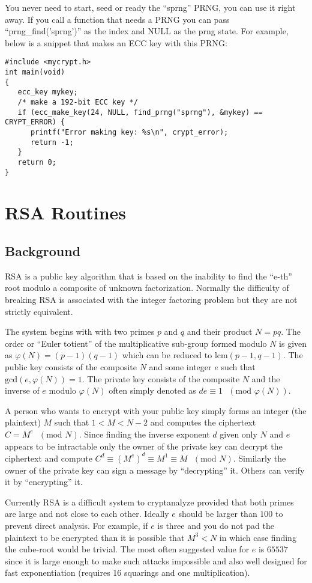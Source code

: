 \documentclass{book}
\def\phi{\varphi}
\begin{document}
You never need to start, seed or ready the ``sprng'' PRNG, you can use it right away.  If you call a function that needs a 
PRNG  you can pass ``prng\_find('sprng')'' as the index and NULL as the prng state.  For example, below is a snippet that
makes an ECC key with this PRNG:
\begin{verbatim}
#include <mycrypt.h>
int main(void)
{
   ecc_key mykey;
   /* make a 192-bit ECC key */
   if (ecc_make_key(24, NULL, find_prng("sprng"), &mykey) == CRYPT_ERROR) {
      printf("Error making key: %s\n", crypt_error);
      return -1;
   }
   return 0;
}
\end{verbatim}

\chapter{RSA Routines}

\section{Background}

RSA is a public key algorithm that is based on the inability to find the ``e-th'' root modulo a composite of unknown 
factorization.  Normally the difficulty of breaking RSA is associated with the integer factoring problem but they are
not strictly equivalent.

The system begins with with two primes $p$ and $q$ and their product $N = pq$.  The order or ``Euler totient'' of the
multiplicative sub-group formed modulo $N$ is given as $\phi(N) = (p - 1)(q - 1)$ which can be reduced to 
$\mbox{lcm}(p - 1, q - 1)$.  The public key consists of the composite $N$ and some integer $e$ such that 
$\mbox{gcd}(e, \phi(N)) = 1$.  The private key consists of the composite $N$ and the inverse of $e$ modulo $\phi(N)$ 
often simply denoted as $de \equiv 1\mbox{ }(\mbox{mod }\phi(N))$.

A person who wants to encrypt with your public key simply forms an integer (the plaintext) $M$ such that 
$1 < M < N-2$ and computes the ciphertext $C = M^e\mbox{ }(\mbox{mod }N)$.  Since finding the inverse exponent $d$
given only $N$ and $e$ appears to be intractable only the owner of the private key can decrypt the ciphertext and compute
$C^d \equiv \left (M^e \right)^d \equiv M^1 \equiv M\mbox{ }(\mbox{mod }N)$.  Similarly the owner of the private key 
can sign a message by ``decrypting'' it.  Others can verify it by ``encrypting'' it.  

Currently RSA is a difficult system to cryptanalyze provided that both primes are large and not close to each other.  
Ideally $e$ should be larger than $100$ to prevent direct analysis.  For example, if $e$ is three and you do not pad
the plaintext to be encrypted than it is possible that $M^3 < N$ in which case finding the cube-root would be trivial.  
The most often suggested value for $e$ is $65537$ since it is large enough to make such attacks impossible and also well 
designed for fast exponentiation (requires 16 squarings and one multiplication).
\end{document}
